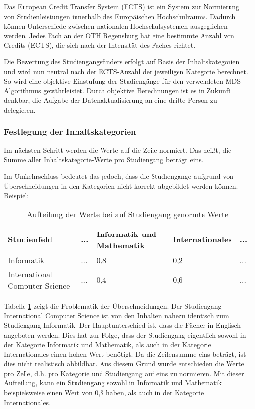 Das European Credit Transfer System (ECTS) ist ein System zur Normierung von Studienleistungen innerhalb des Europäischen Hochschulraums. Dadurch können Unterschiede zwischen nationalen Hochschulsystemen ausgeglichen werden. \parencite{european_commission_europaisches_nodate} Jedes Fach an der OTH Regensburg hat eine bestimmte Anzahl von Credits (ECTS), die sich nach der Intensität des Faches richtet.

Die Bewertung des Studiengangsfinders erfolgt auf Basis der Inhaltskategorien und wird nun neutral nach der ECTS-Anzahl der jeweiligen Kategorie berechnet. So wird eine objektive Einstufung der Studiengänge für den verwendeten MDS-Algorithmus gewährleistet. Durch objektive Berechnungen ist es in Zukunft denkbar, die Aufgabe der Datenaktualisierung an eine dritte Person zu delegieren.

\subsubsection{Festlegung der Inhaltskategorien}
Im nächsten Schritt werden die Werte auf die Zeile normiert. Das heißt, die
Summe aller Inhaltskategorie-Werte pro Studiengang beträgt eins.

Im Umkehrschluss bedeutet das jedoch, dass die Studiengänge aufgrund von
Überschneidungen in den Kategorien nicht korrekt abgebildet werden können.
Beispiel:

\begin{table}[!ht]
    \centering
    \begin{tabular}{|l|l|l|l|l|}
    \hline
    \textbf{Studienfeld}           & \textbf{...} & \textbf{Informatik und Mathematik} & \textbf{Internationales} & \textbf{...} \\ \hline
    Informatik                     & ...          & 0,8                                & 0,2                      & ...          \\ \hline
    International Computer Science & ...          & 0,4                                & 0,6                      & ...          \\ \hline
    \end{tabular}

    \caption{Aufteilung der Werte bei auf Studiengang genormte Werte}
    \label{table:norm-values}
\end{table}

Tabelle \ref{table:norm-values} zeigt die Problematik der Überschneidungen. Der
Studiengang International Computer Science ist von den Inhalten nahezu
identisch zum Studiengang Informatik. Der Hauptunterschied ist, dass die Fächer
in Englisch angeboten werden. Dies hat zur Folge, dass der Studiengang
eigentlich sowohl in der Kategorie Informatik und Mathematik, als auch in der
Kategorie Internationales einen hohen Wert benötigt. Da die Zeilensumme eins
beträgt, ist dies nicht realistisch abbildbar. Aus diesem Grund wurde
entschieden die Werte pro Zelle, d.h. pro Kategorie und Studiengang auf eins
zu normieren. Mit dieser Aufteilung, kann ein Studiengang sowohl in Informatik
und Mathematik beispielsweise einen Wert von 0,8 haben, als auch in der
Kategorie Internationales.

